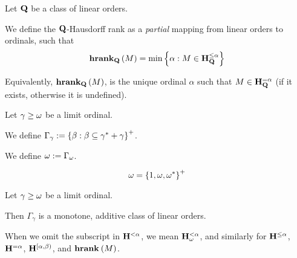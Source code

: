 \begin{definition}
  Let $\mathbf{Q}$ be a class of linear orders.

  We define the $\mathbf{Q}$-Hausdorff rank as a \emph{partial} mapping
  from linear orders to ordinals, such that
  \[
    \mathbf{hrank}_{\mathbf{Q}} \left( {M} \right) = \min \left\{ {\alpha : M \in \mathbf{H}_{\mathbf{Q}}^{\le \alpha}} \right\}
  \]

  Equivalently, $\mathbf{hrank}_{\mathbf{Q}} \left( {M} \right)$, is the unique ordinal $\alpha$ such that
  $M \in \mathbf{H}_{\mathbf{Q}}^{= \alpha}$ (if it exists, otherwise it is undefined).

\end{definition}


\begin{definition}
  Let $\gamma \ge \omega$ be a limit ordinal.

  We define $\Gamma_{\gamma} := \left\{ {\beta : \beta \subseteq \gamma^\ast + \gamma} \right\}^+$.

  We define $\omega := \Gamma_{\omega}$.
\end{definition}

\begin{example}
  \[
    \omega = \left\{ {1, \omega, \omega^\ast} \right\}^+
  \]
\end{example}

\begin{observation}
  Let $\gamma \ge \omega$ be a limit ordinal.

  Then $\Gamma_{\gamma}$ is a monotone, additive class of linear orders.
\end{observation}


\begin{notation}
  When we omit the subscript in $\mathbf{H}_{}^{< \alpha}$,
  we mean $\mathbf{H}_{\omega}^{< \alpha}$,
  and similarly for $\mathbf{H}_{}^{\le \alpha}$, $\mathbf{H}_{}^{= \alpha}$, $\mathbf{H}_{}^{[\alpha, \beta)}$,
  and $\mathbf{hrank}_{} \left( {M} \right)$.
\end{notation}
